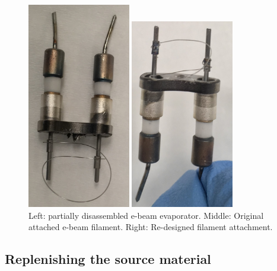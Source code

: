 \begin{figure}[H]
\begin{minipage}[b]{0.33\linewidth}
	\includegraphics[width=0.4\textwidth]{filament.jpg}  %
\end{minipage}\hfill
\begin{minipage}[b]{0.33\linewidth}
	\centering
	\includegraphics[width=0.4\textwidth]{filament_new_design.jpg}  %
\end{minipage}\hfill
	\caption{Left: partially disassembled e-beam evaporator. Middle: Original attached e-beam filament. Right: Re-designed filament attachment.}
	\label{fig:filament}
\end{figure}

\subsection{Replenishing the source material}
